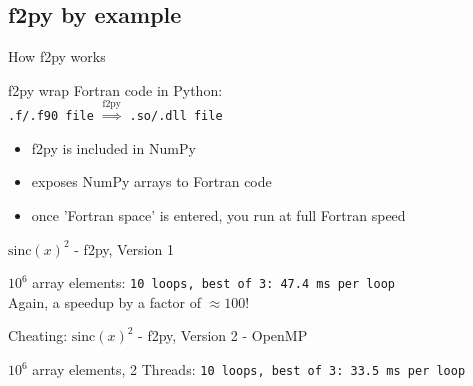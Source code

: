 \subsection{f2py by example}

\begin{frame}{How f2py works}

\begin{exbox}{f2py}
wrap Fortran code in Python:\\[1ex]
{\texttt{.f/.f90 file}} $\stackrel{\text{f2py}}{\Longrightarrow}$ {\texttt{.so/.dll file}}
\end{exbox}

\begin{itemize}
    \item f2py is included in NumPy
    \item exposes NumPy arrays to Fortran code
    \item once 'Fortran space' is entered, you run at full Fortran speed
\end{itemize}

\end{frame}

\begin{frame}[fragile]{$\mathrm{sinc}(x)^{2}$ - f2py, Version 1}



\pause
$10^{6}$ array elements: {\texttt{10 loops, best of 3: 47.4 ms per loop}}\\
Again, a \alert{speedup by a factor of $\approx 100$}!

\end{frame}

\begin{frame}[fragile]{Cheating: $\mathrm{sinc}(x)^{2}$ - f2py, Version 2 - OpenMP}



\pause
$10^{6}$ array elements, 2 Threads: {\texttt{10 loops, best of 3: 33.5 ms per loop}}
\end{frame}

